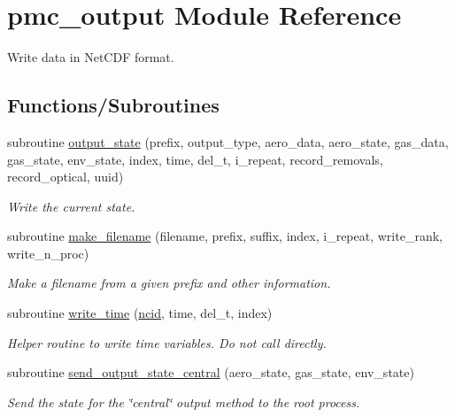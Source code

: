 \hypertarget{namespacepmc__output}{}\section{pmc\+\_\+output Module Reference}
\label{namespacepmc__output}


Write data in Net\+C\+DF format.  


\subsection*{Functions/\+Subroutines}
\begin{DoxyCompactItemize}
\item 
subroutine \mbox{\hyperlink{namespacepmc__output_a3450534dae32c9b056de1292c80e0472}{output\+\_\+state}} (prefix, output\+\_\+type, aero\+\_\+data, aero\+\_\+state, gas\+\_\+data, gas\+\_\+state, env\+\_\+state, index, time, del\+\_\+t, i\+\_\+repeat, record\+\_\+removals, record\+\_\+optical, uuid)
\begin{DoxyCompactList}\small\item\em Write the current state. \end{DoxyCompactList}\item 
subroutine \mbox{\hyperlink{namespacepmc__output_a28f96c3135783c6d5357fb82bbc77b3e}{make\+\_\+filename}} (filename, prefix, suffix, index, i\+\_\+repeat, write\+\_\+rank, write\+\_\+n\+\_\+proc)
\begin{DoxyCompactList}\small\item\em Make a filename from a given prefix and other information. \end{DoxyCompactList}\item 
subroutine \mbox{\hyperlink{namespacepmc__output_a3ca0a8e4963dc8daf105db36fedda4ea}{write\+\_\+time}} (\mbox{\hyperlink{fractal_8_f90_a4e89f3f850921ff84a6dfce8b166ad50}{ncid}}, time, del\+\_\+t, index)
\begin{DoxyCompactList}\small\item\em Helper routine to write time variables. Do not call directly. \end{DoxyCompactList}\item 
subroutine \mbox{\hyperlink{namespacepmc__output_a103f78373256be1b8718a1da9d46da8d}{send\+\_\+output\+\_\+state\+\_\+central}} (aero\+\_\+state, gas\+\_\+state, env\+\_\+state)
\begin{DoxyCompactList}\small\item\em Send the state for the \char`\"{}central\char`\"{} output method to the root process. \end{DoxyCompactList}\item 

\end{DoxyCompactItemize}
